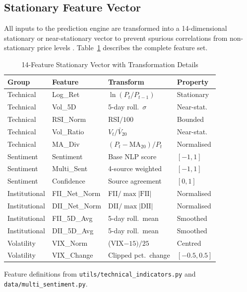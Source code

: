 \documentclass[ASNA,twocolumn]{USG}
\begin{document}
\subsection{Stationary Feature Vector}

All inputs to the prediction engine are transformed into a 14-dimensional
stationary or near-stationary vector to prevent spurious correlations from
non-stationary price levels \citep{hamilton1989}.
Table~\ref{tab:features} describes the complete feature set.

\begin{table}[!t]
\caption{14-Feature Stationary Vector with Transformation Details\label{tab:features}}
\begin{tabular*}{\columnwidth}{@{\extracolsep\fill}llll@{\extracolsep\fill}}
\toprule
\textbf{Group} & \textbf{Feature} & \textbf{Transform} & \textbf{Property} \\
\midrule
Technical & Log\_Ret   & $\ln(P_t/P_{t-1})$   & Stationary \\
Technical & Vol\_5D    & 5-day roll.\ $\sigma$ & Near-stat. \\
Technical & RSI\_Norm  & RSI$/100$             & Bounded \\
Technical & Vol\_Ratio & $V_t/\bar{V}_{20}$    & Near-stat. \\
Technical & MA\_Div    & $(P_t-\text{MA}_{20})/P_t$ & Normalised \\
Sentiment & Sentiment  & Base NLP score        & $[-1,1]$ \\
Sentiment & Multi\_Sent& 4-source weighted     & $[-1,1]$ \\
Sentiment & Confidence & Source agreement      & $[0,1]$ \\
Institutional & FII\_Net\_Norm & FII$/\max|\text{FII}|$ & Normalised \\
Institutional & DII\_Net\_Norm & DII$/\max|\text{DII}|$ & Normalised \\
Institutional & FII\_5D\_Avg  & 5-day roll.\ mean     & Smoothed \\
Institutional & DII\_5D\_Avg  & 5-day roll.\ mean     & Smoothed \\
Volatility & VIX\_Norm   & (VIX$-15)/25$         & Centred \\
Volatility & VIX\_Change & Clipped pct.\ change  & $[-0.5,0.5]$ \\
\bottomrule
\end{tabular*}
\begin{tablenotes}
\item[\textit{Source:}] Feature definitions from \texttt{utils/technical\_indicators.py}
  and \texttt{data/multi\_sentiment.py}.
\end{tablenotes}
\end{table}
\end{document}
